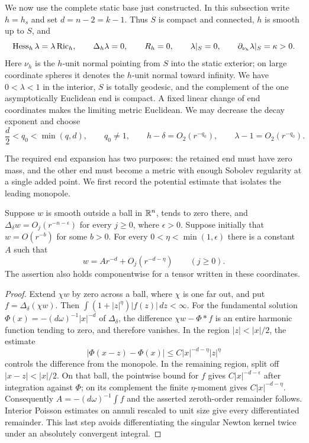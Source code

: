 We now use the complete static base just constructed.  In this subsection
write $h=h_s$ and set $d=n-2=k-1$.  Thus $S$ is compact and connected,
$h$ is smooth up to $S$, and
\begin{equation}
 \operatorname{Hess}_h\lambda=\lambda\operatorname{Ric}_h,\qquad
 \Delta_h\lambda=0,\qquad R_h=0,\qquad
 \lambda|_S=0,\qquad \partial_{\nu_h}\lambda|_S=\kappa>0.
 \label{eq:static:base-for-double}
\end{equation}
Here $\nu_h$ is the $h$-unit normal pointing from $S$ into the static
exterior; on large coordinate spheres it denotes the $h$-unit normal
toward infinity.  We have $0<\lambda<1$ in the interior, $S$ is
totally geodesic, and the
complement of the one asymptotically Euclidean end is compact.  A fixed
linear change of end coordinates makes the limiting metric Euclidean.
We may decrease the decay exponent and choose
\[
 \frac d2<q_0<\min(q,d),\qquad q_0\ne1,
 \qquad h-\delta=O_2(r^{-q_0}),\qquad
 \lambda-1=O_2(r^{-q_0}).
\]

The required end expansion has two purposes: the retained end must
have zero mass, and the other end must become a metric with enough
Sobolev regularity at a single added point.  We first record the
potential estimate that isolates the leading monopole.

\begin{lemma}
\label{lem:static:poisson-tail}
Suppose $w$ is smooth outside a ball in $\mathbb R^n$, tends to zero there,
and $\Delta_\delta w=O_j(r^{-n-\epsilon})$ for every $j\ge0$, where
$\epsilon>0$.  Suppose initially that $w=O(r^{-b})$ for some $b>0$.
For every $0<\eta<\min(1,\epsilon)$ there is a constant $A$ such that
\[
 w=A r^{-d}+O_j(r^{-d-\eta})\qquad(j\ge0).
\]
The assertion also holds componentwise for a tensor written in these
coordinates.
\end{lemma}

\begin{proof}
Extend $\chi w$ by zero across a ball, where $\chi$ is one far out, and
put $f=\Delta_\delta(\chi w)$.  Then
$\int(1+|z|^\eta)|f(z)|\,dz<\infty$.  For the fundamental solution
$\Phi(x)=-(d\omega)^{-1}|x|^{-d}$ of $\Delta_\delta$, the difference
$\chi w-\Phi*f$ is an entire harmonic function tending to zero, and
therefore vanishes.  In the region $|z|<|x|/2$, the estimate
\[
 |\Phi(x-z)-\Phi(x)|
 \le C|x|^{-d-\eta}|z|^\eta
\]
controls the difference from the monopole.  In the remaining region,
split off $|x-z|<|x|/2$.  On that ball, the pointwise bound for $f$
gives $C|x|^{-d-\epsilon}$ after integration against $\Phi$; on its
complement the finite $\eta$-moment gives $C|x|^{-d-\eta}$.
Consequently $A=-(d\omega)^{-1}\int f$ and the asserted zeroth-order
remainder follows.  Interior Poisson estimates on annuli rescaled to
unit size give every differentiated remainder.  This last step avoids
differentiating the singular Newton kernel twice under an absolutely
convergent integral.
\end{proof}

